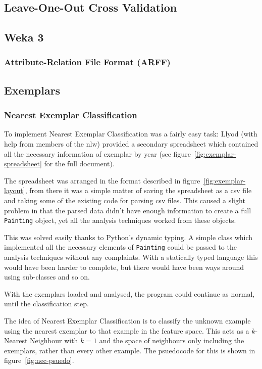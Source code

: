 \subsection{Leave-One-Out Cross Validation}

\subsection{Weka 3}
\subsubsection{Attribute-Relation File Format (ARFF)}

\subsection{Exemplars}
\subsubsection{Nearest Exemplar Classification}
To implement Nearest Exemplar Classification was a fairly easy task: Llyod (with help from members
of the \gls{nlw}) provided a secondary spreadsheet which contained all the necessary information 
of exemplar by year (see figure~\ref{fig:exemplar-spreadsheet} for the full document).

The spreadsheet was arranged in the format described in figure~\ref{fig:exemplar-layout}, from
there it was a simple matter of saving the spreadsheet as a \gls{csv} file and taking some of the
existing code for parsing \gls{csv} files. This caused a slight problem in that the parsed data
didn't have enough information to create a full \verb+Painting+ object, yet all the analysis
techniques worked from these objects.

This was solved easily thanks to Python's dynamic typing. A simple class which implemented all the
necessary elements of \verb+Painting+ could be passed to the analysis techniques without any
complaints. With a statically typed language this would have been harder to complete, but there
would have been ways around using sub-classes and so on.

With the exemplars loaded and analysed, the program could continue as normal, until the
classification step.

The idea of Nearest Exemplar Classification is to classify the unknown example using the nearest
exemplar to that example in the feature space. This acts as a $k$-Nearest Neighbour with $k=1$ and
the space of neighbours only including the exemplars, rather than every other example. The 
psuedocode for this is shown in figure~\ref{fig:nec-psuedo}.

